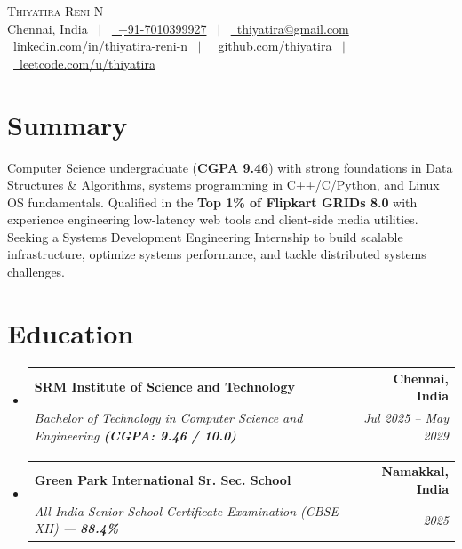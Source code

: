 \documentclass[letterpaper,10pt]{article}
\makeatletter
\newcommand{\resumeSubheading}[4]{
  \vspace{-1pt}\item
    \begin{tabular*}{1.0\textwidth}[t]{l@{\extracolsep{\fill}}r}
      \textbf{#1} & \textbf{\small #2} \\
      \textit{\small#3} & \textit{\small #4} \\
    \end{tabular*}\vspace{-4pt}
}
\newcommand{\resumeSubHeadingListStart}{\begin{itemize}[leftmargin=0.0in, label={}]}
\newcommand{\resumeSubHeadingListEnd}{\end{itemize}}
\makeatother
\begin{document}
\begin{center}
    {\Huge \scshape Thiyatira Reni N} \\ \vspace{4pt}
    \small Chennai, India \ $|$ \ 
    \href{tel:+917010399927}{\faPhone\ +91-7010399927} \ $|$ \ 
    \href{mailto:thiyatira@gmail.com}{\faEnvelope\ thiyatira@gmail.com} \\ \vspace{3pt}
    \href{https://www.linkedin.com/in/thiyatira-reni-n-19668b384/}{\faLinkedin\ \underline{linkedin.com/in/thiyatira-reni-n}} \ $|$ \ 
    \href{https://github.com/thiyatira}{\faGithub\ \underline{github.com/thiyatira}} \ $|$ \ 
    \href{https://leetcode.com/u/thiyatira/}{\faCode\ \underline{leetcode.com/u/thiyatira}}
\end{center}

\section{Summary}
\small{Computer Science undergraduate (\textbf{CGPA 9.46}) with strong foundations in Data Structures \& Algorithms, systems programming in C++/C/Python, and Linux OS fundamentals. Qualified in the \textbf{Top 1\% of Flipkart GRIDs 8.0} with experience engineering low-latency web tools and client-side media utilities. Seeking a Systems Development Engineering Internship to build scalable infrastructure, optimize systems performance, and tackle distributed systems challenges.}

\section{Education}
  \resumeSubHeadingListStart
    \resumeSubheading
      {SRM Institute of Science and Technology}{Chennai, India}
      {Bachelor of Technology in Computer Science and Engineering \textbf{(CGPA: 9.46 / 10.0)}}{Jul 2025 -- May 2029}
    \resumeSubheading
      {Green Park International Sr. Sec. School}{Namakkal, India}
      {All India Senior School Certificate Examination (CBSE XII) --- \textbf{88.4\%}}{2025}
  \resumeSubHeadingListEnd

\end{document}
